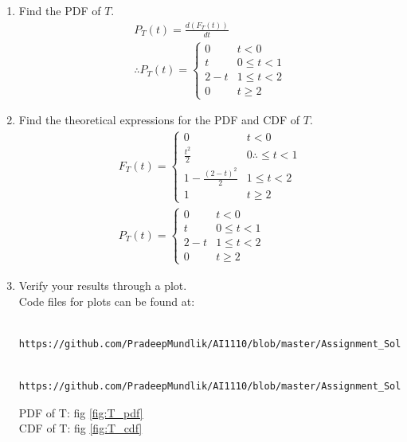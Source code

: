 \documentclass[journal,12pt,twocolumn]{IEEEtran}
\renewcommand\thesection{\arabic{section}}
\begin{document}
\begin{enumerate}[label=\thesection.\arabic*
,ref=\thesection.\theenumi]
\item Find the PDF of $T$. \\
\solution 
\begin{align}
	P_T(t) = \frac{d(F_T(t))}{dt} \\
	\therefore P_T(t) = 
	\begin{cases}
		0 & t < 0 \\
		t &  0 \leq t < 1 \\
		2-t & 1 \leq t < 2 \\
		0  & t \geq 2
	\end{cases}
\end{align}
\item Find the theoretical expressions for the PDF and CDF of $T$. \\
\solution 
\begin{align}
	F_T(t) =  
	 \begin{cases}
		0 & t<0 \\
		\frac{t^2}{2} & 0 \therefore \leq t < 1 \\
		1 - \frac{(2-t)^2}{2} & 1 \leq t < 2 \\
		1 & t \geq 2
	 \end{cases} \\
	 P_T(t) = 
	 \begin{cases}
		 0 & t < 0 \\
		 t &  0 \leq t < 1 \\
		 2-t & 1 \leq t < 2 \\
		 0  & t \geq 2
	 \end{cases}
\end{align}
\item Verify your results through a plot. \\
\solution 
Code files for plots can be found at:
\begin{lstlisting}
	https://github.com/PradeepMundlik/AI1110/blob/master/Assignment_Soln/codes/4/T_pdf.py
\end{lstlisting}
\begin{lstlisting}
	https://github.com/PradeepMundlik/AI1110/blob/master/Assignment_Soln/codes/4/T_cdf.py
\end{lstlisting}
PDF of T: fig \ref*{fig:T_pdf} \\
CDF of T: fig \ref*{fig:T_cdf}
\begin{figure}[h]
	\centering

\end{figure}
\end{enumerate}
\end{document}

